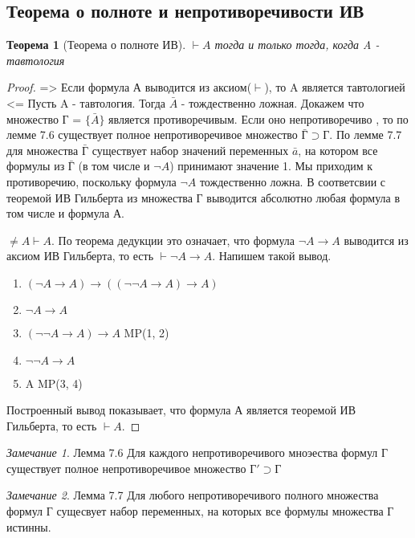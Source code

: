 \documentclass[a4paper]{article}
\newtheorem{theorem}{Теорема}[section]
\theoremstyle{definition}
\theoremstyle{remark}
\newtheorem*{remark}{Замечание}
\begin{document}
    \subsection{Теорема о полноте и непротиворечивости ИВ}
	\begin{theorem}[Теорема о полноте ИВ]
		$\vdash A$ тогда и только тогда, когда A - тавтология
	\end{theorem}
	\begin{proof}
		=> Если формула А выводится из аксиом($\vdash$), то A является тавтологией
		<= Пусть A - тавтология. Тогда $\bar{A}$ - тождественно ложная. Докажем что множество Г = $\{\bar{A}\}$ является противоречивым. Если оно непротиворечиво , то по лемме 7.6 существует полное непротиворечивое множество $\bar{Г} \supset Г$. По лемме 7.7 для множества $\bar{Г}$ существует набор значений переменных $\bar{a}$, на котором все формулы из $\bar{Г}$ (в том числе и $\neg A$) принимают значение 1. Мы приходим к противоречию, поскольку формула $\neg A$ тождественно ложна. В соответсвии с теоремой ИВ Гильберта из множества Г выводится абсолютно любая формула в том числе и формула А.

		$\neq A \vdash A$. По теорема дедукции это означает, что формула $\neg A \rightarrow A$ выводится из аксиом ИВ Гильберта, то есть $\vdash \neg A \rightarrow A$. Напишем такой вывод.
		\begin{enumerate}
			\item $(\neg A \rightarrow A) \rightarrow ((\neg\neg A \rightarrow A) \rightarrow A)$
			\item $\neg A \rightarrow A$
			\item $(\neg\neg A \rightarrow A) \rightarrow A$ MP(1, 2)
			\item $\neg\neg A \rightarrow A$
			\item A MP(3, 4)
		\end{enumerate}

		Построенный вывод показывает, что формула А является теоремой ИВ Гильберта, то есть $\vdash A$. 
	\end{proof}
	\begin{remark}
		Лемма 7.6 Для каждого непротиворечивого мноэества формул Г существует полное непротиворечивое множество $Г' \supset Г$
	\end{remark}
	\begin{remark}
		Лемма 7.7 Для любого непротиворечивого полного множества формул Г сущесвует набор переменных, на которых все формулы множества Г истинны.
	\end{remark}
\end{document}
